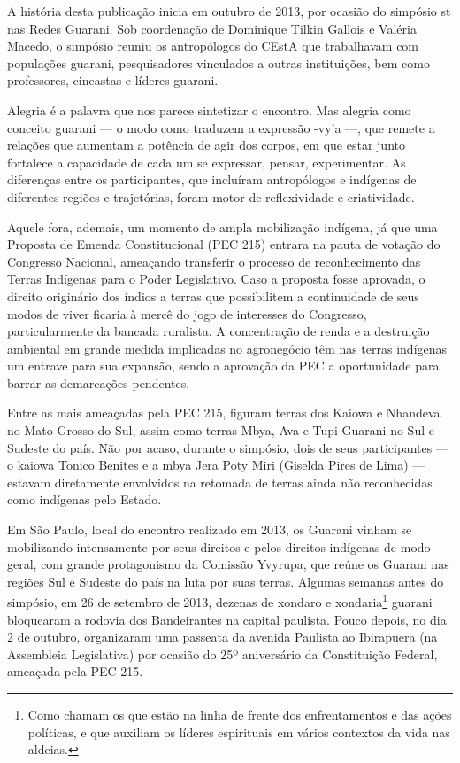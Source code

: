 A história desta publicação inicia em outubro de 2013, por ocasião do
simpósio st nas Redes Guarani.  Sob coordenação de Dominique Tilkin
Gallois e Valéria Macedo, o simpósio reuniu os antropólogos do CEstA
que trabalhavam com populações guarani, pesquisadores vinculados a
outras instituições, bem como professores, cineastas e líderes guarani.

Alegria é a palavra que nos parece sintetizar o encontro. Mas alegria
como conceito guarani — o modo como traduzem a expressão -vy’a —, que
remete a relações que aumentam a potência de agir dos corpos, em que
estar junto fortalece a capacidade de cada um se expressar, pensar,
experimentar. As diferenças entre os participantes, que incluíram
antropólogos e indígenas de diferentes regiões e trajetórias, foram
motor de reflexividade e criatividade.

Aquele fora, ademais, um momento de ampla mobilização indígena, já que
uma Proposta de Emenda Constitucional (PEC 215) entrara na pauta de
votação do Congresso Nacional, ameaçando transferir o processo de
reconhecimento das Terras Indígenas para o Poder Legislativo. Caso a
proposta fosse aprovada, o direito originário dos índios a terras que
possibilitem a continuidade de seus modos de viver ficaria à mercê do
jogo de interesses do Congresso, particularmente da bancada ruralista.
A concentração de renda e a destruição ambiental em grande medida
implicadas no agronegócio têm nas terras indígenas um entrave para sua
expansão, sendo a aprovação da PEC a oportunidade para barrar as
demarcações pendentes.

Entre as mais ameaçadas pela PEC 215, figuram terras dos Kaiowa e
Nhandeva no Mato Grosso do Sul, assim como terras Mbya, Ava e Tupi
Guarani no Sul e Sudeste do país. Não por acaso, durante o simpósio,
dois de seus participantes — o kaiowa Tonico Benites e a mbya Jera Poty
Miri (Giselda Pires de Lima) — estavam diretamente envolvidos na
retomada de terras ainda não reconhecidas como indígenas pelo Estado. 

Em São Paulo, local do encontro realizado em 2013, os Guarani vinham se
mobilizando intensamente por seus direitos e pelos direitos indígenas
de modo geral, com grande protagonismo da Comissão Yvyrupa, que reúne
os Guarani nas regiões Sul e Sudeste do país na luta por suas terras.
Algumas semanas antes do simpósio, em 26 de setembro de 2013, dezenas
de xondaro e xondaria\footnote{Como chamam os que estão na linha de
frente dos enfrentamentos e das ações políticas, e que auxiliam os
líderes espirituais em vários contextos da vida nas aldeias.} guarani
bloquearam a rodovia dos Bandeirantes na capital paulista. Pouco
depois, no dia 2 de outubro, organizaram uma passeata da avenida
Paulista ao Ibirapuera (na Assembleia Legislativa) por ocasião do 25º
aniversário da Constituição Federal, ameaçada pela PEC 215. 


